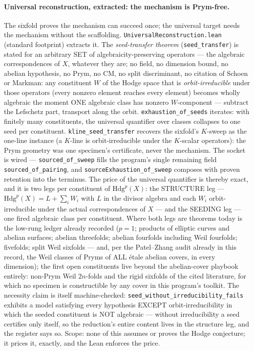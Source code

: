 \documentclass[11pt]{article}
\theoremstyle{definition}
\theoremstyle{remark}
\begin{document}
\paragraph{Universal reconstruction, extracted: the mechanism is
Prym-free.}  The sixfold proves the mechanism can succeed once; the
universal target needs the mechanism without the scaffolding.
\texttt{UniversalReconstruction.lean} (standard footprint) extracts it.
The \emph{seed-transfer theorem} (\texttt{seed\_transfer}) is stated for
an arbitrary SET of algebraicity-preserving operators --- the algebraic
correspondences of $X$, whatever they are; no field, no dimension bound,
no abelian hypothesis, no Prym, no CM, no split discriminant, no
citation of Schoen or Markman: any constituent $W$ of the Hodge space
that is \emph{orbit-irreducible} under those operators (every nonzero
element reaches every element) becomes wholly algebraic the moment ONE
algebraic class has nonzero $W$-component --- subtract the Lefschetz
part, transport along the orbit.  \texttt{exhaustion\_of\_seeds}
iterates: with finitely many constituents, the universal quantifier over
classes collapses to one seed per constituent.
\texttt{kline\_seed\_transfer} recovers the sixfold's $K$-sweep as the
one-line instance (a $K$-line is orbit-irreducible under the $K$-scalar
operators): the Prym geometry was one specimen's certificate, never the
mechanism.  The socket is wired --- \texttt{sourced\_of\_sweep} fills
the program's single remaining field \texttt{sourced\_of\_pairing}, and
\texttt{sourceExhaustion\_of\_sweep} composes with proven retention into
the terminus.  The price of the universal quantifier is thereby exact,
and it is two legs per constituent of $\mathrm{Hdg}^p(X)$: the
STRUCTURE leg --- $\mathrm{Hdg}^p(X)=L+\sum_i W_i$ with $L$ in the
divisor algebra and each $W_i$ orbit-irreducible under the actual
correspondences of $X$ --- and the SEEDING leg --- one fired algebraic
class per constituent.  Where both legs are theorems today is the
low-rung ledger already recorded ($p=1$; products of elliptic curves and
abelian surfaces; abelian threefolds; abelian fourfolds including Weil
fourfolds; fivefolds; split Weil sixfolds --- and, per the
Patel--Zhang audit already in this record, the Weil classes of Pryms
of ALL \'etale abelian covers, in every dimension); the first open
constituents live beyond the abelian-cover playbook entirely:
non-Prym Weil $2n$-folds and the rigid sixfolds of the cited
literature, for which no specimen is constructible by any cover in
this program's toolkit.  The necessity claim is itself
machine-checked: \texttt{seed\_without\_irreducibility\_fails} exhibits
a model satisfying every hypothesis EXCEPT orbit-irreducibility in which
the seeded constituent is NOT algebraic --- without irreducibility a
seed certifies only itself, so the reduction's entire content lives in
the structure leg, and the register says so.  Scope: none of this
assumes or proves the Hodge conjecture; it prices it, exactly, and the
Lean enforces the price.
\end{document}
